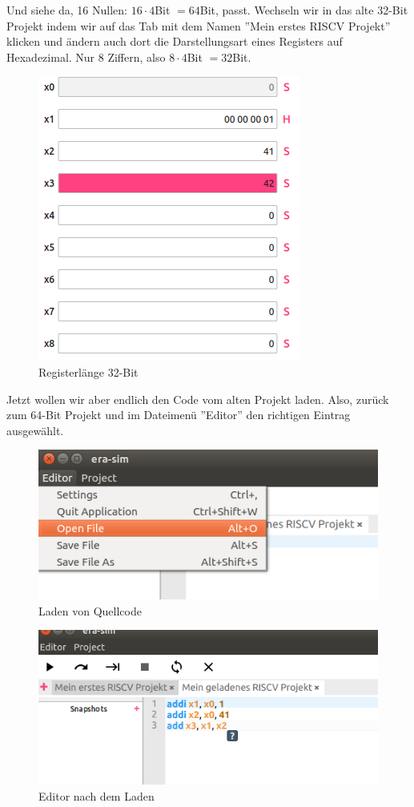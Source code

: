 Und siehe da, 16 Nullen: $16 \cdot 4$Bit $=64$Bit, passt. Wechseln wir in das
alte 32-Bit Projekt indem wir auf das Tab mit dem Namen ''Mein erstes RISCV
Projekt'' klicken und ändern auch dort die Darstellungsart eines Registers auf
Hexadezimal. Nur 8 Ziffern, also $8 \cdot 4$Bit $=32$Bit.
\begin{figure}[H]
	\centering
	\includegraphics[scale=1.0]{Images/first-steps-10.png}
	\caption{Registerlänge 32-Bit}
\end{figure}

Jetzt wollen wir aber endlich den Code vom alten Projekt laden. Also, zurück zum
64-Bit Projekt und im Dateimenü ''Editor'' den richtigen Eintrag ausgewählt.
\begin{figure}[H]
	\centering
	\includegraphics[scale=1.0]{Images/first-steps-11.png}
	\caption{Laden von Quellcode}
\end{figure}

\begin{figure}[H]
	\centering
	\includegraphics[scale=1.0]{Images/first-steps-12.png}
	\caption{Editor nach dem Laden}
\end{figure}

